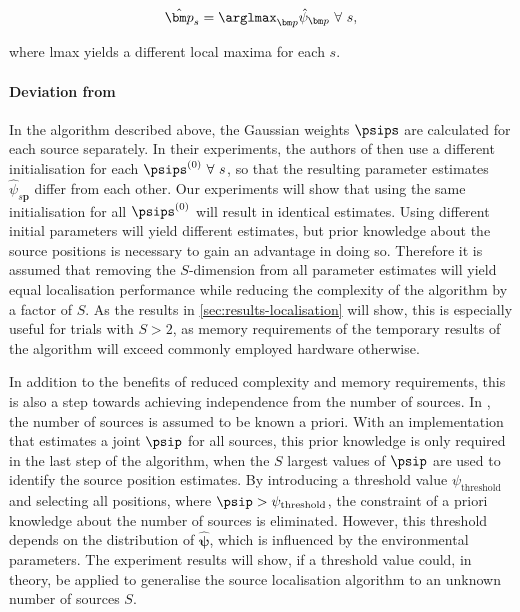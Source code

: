 \begin{equation}\label{eq:find_positions}
    \hat{\bm p}_s=\arglmax_{\bm p}\hat{\psi}_{\bm p}\ \forall\ s,
\end{equation}

where lmax yields a different local maxima for each $s$.



\paragraph{Deviation from \cite{Schwartz2014}}
In the algorithm described above, the Gaussian weights $\psips$ are calculated for each source separately. In their experiments, the authors of \cite{Schwartz2014} then use a different initialisation for each $\psips^{\text{(0)}}\ \forall\ s$, so that the resulting parameter estimates $\hat\psi_{s\bm p}$ differ from each other. Our experiments will show that using the same initialisation for all $\psips^{\text{(0)}}$ will result in identical estimates. Using different initial parameters will yield different estimates, but prior knowledge about the source positions is necessary to gain an advantage in doing so. Therefore it is assumed that removing the $S$-dimension from all parameter estimates will yield equal localisation performance while reducing the complexity of the algorithm by a factor of $S$. As the results in \autoref{sec:results-localisation} will show, this is especially useful for trials with $S>2$, as memory requirements of the temporary results of the algorithm will exceed commonly employed hardware otherwise.

In addition to the benefits of reduced complexity and memory requirements, this is also a step towards achieving independence from the number of sources. In \cite{Schwartz2014}, the number of sources is assumed to be known a priori. With an implementation that estimates a joint $\psip$ for all sources, this prior knowledge is only required in the last step of the algorithm, when the $S$ largest values of $\psip$ are used to identify the source position estimates. By introducing a threshold value $\psi_{\text{threshold}}$ and selecting all positions, where $\psip>\psi_{\text{threshold}}$, the constraint of a priori knowledge about the number of sources is eliminated. However, this threshold depends on the distribution of $\hat{\bm\psi}$, which is influenced by the environmental parameters. The experiment results will show, if a threshold value could, in theory, be applied to generalise the source localisation algorithm to an unknown number of sources $S$.
